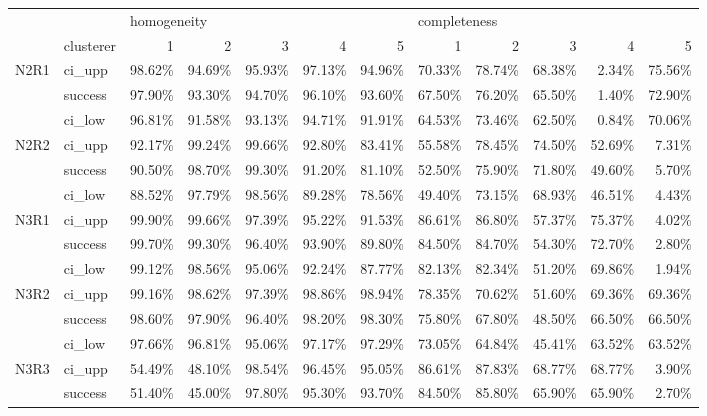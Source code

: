 \begin{tabular}{llrrrrrrrrrr}
\toprule
     & {} & \multicolumn{5}{l}{homogeneity} & \multicolumn{5}{l}{completeness} \\
     & clusterer &           1 &      2 &      3 &      4 &      5 &            1 &      2 &      3 &      4 &      5 \\
\midrule
N2R1 & ci\_upp &      98.62\% & 94.69\% & 95.93\% & 97.13\% & 94.96\% &       70.33\% & 78.74\% & 68.38\% &  2.34\% & 75.56\% \\
     & success &      97.90\% & 93.30\% & 94.70\% & 96.10\% & 93.60\% &       67.50\% & 76.20\% & 65.50\% &  1.40\% & 72.90\% \\
     & ci\_low &      96.81\% & 91.58\% & 93.13\% & 94.71\% & 91.91\% &       64.53\% & 73.46\% & 62.50\% &  0.84\% & 70.06\% \\
N2R2 & ci\_upp &      92.17\% & 99.24\% & 99.66\% & 92.80\% & 83.41\% &       55.58\% & 78.45\% & 74.50\% & 52.69\% &  7.31\% \\
     & success &      90.50\% & 98.70\% & 99.30\% & 91.20\% & 81.10\% &       52.50\% & 75.90\% & 71.80\% & 49.60\% &  5.70\% \\
     & ci\_low &      88.52\% & 97.79\% & 98.56\% & 89.28\% & 78.56\% &       49.40\% & 73.15\% & 68.93\% & 46.51\% &  4.43\% \\
N3R1 & ci\_upp &      99.90\% & 99.66\% & 97.39\% & 95.22\% & 91.53\% &       86.61\% & 86.80\% & 57.37\% & 75.37\% &  4.02\% \\
     & success &      99.70\% & 99.30\% & 96.40\% & 93.90\% & 89.80\% &       84.50\% & 84.70\% & 54.30\% & 72.70\% &  2.80\% \\
     & ci\_low &      99.12\% & 98.56\% & 95.06\% & 92.24\% & 87.77\% &       82.13\% & 82.34\% & 51.20\% & 69.86\% &  1.94\% \\
N3R2 & ci\_upp &      99.16\% & 98.62\% & 97.39\% & 98.86\% & 98.94\% &       78.35\% & 70.62\% & 51.60\% & 69.36\% & 69.36\% \\
     & success &      98.60\% & 97.90\% & 96.40\% & 98.20\% & 98.30\% &       75.80\% & 67.80\% & 48.50\% & 66.50\% & 66.50\% \\
     & ci\_low &      97.66\% & 96.81\% & 95.06\% & 97.17\% & 97.29\% &       73.05\% & 64.84\% & 45.41\% & 63.52\% & 63.52\% \\
N3R3 & ci\_upp &      54.49\% & 48.10\% & 98.54\% & 96.45\% & 95.05\% &       86.61\% & 87.83\% & 68.77\% & 68.77\% &  3.90\% \\
     & success &      51.40\% & 45.00\% & 97.80\% & 95.30\% & 93.70\% &       84.50\% & 85.80\% & 65.90\% & 65.90\% &  2.70\% \\

\end{tabular}
